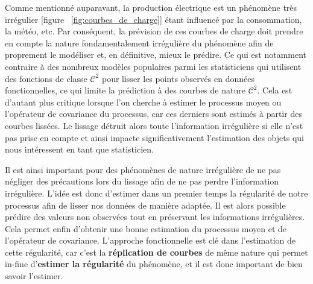 Comme mentionné auparavant, la production électrique est un phénomène très irrégulier [figure ~\ref{fig:courbes_de_charge}] étant influencé par la consommation, la météo, etc. Par conséquent, la prévision de ces courbes de charge doit prendre en compte la nature fondamentalement irrégulière du phénomène afin de proprement le modéliser et, en définitive, mieux le prédire. Ce qui est notamment contraire à des
nombreux modèles populaires parmi les statisticiens qui utilisent des fonctions de classe $\mathcal C^2$ pour lisser les points observés en données fonctionnelles, ce qui limite la prédiction à des courbes de nature $\mathcal C^2$. Cela est d'autant plus critique lorsque l'on cherche à estimer le processus moyen ou l'opérateur de covariance du processus, car ces derniers sont estimés à partir des courbes lissées. Le lissage détruit alors toute l'information irrégulière si elle n'est pas prise en compte et ainsi impacte significativement l'estimation des objets qui nous intéressent en tant que statisticien.




Il est ainsi important pour des phénomènes de nature irrégulière de ne pas négliger des précautions lors du lissage afin de ne pas perdre l'information irrégulière. L'idée est donc d'estimer dans un premier temps la régularité de notre processus afin de lisser nos données de manière adaptée. Il est alors possible prédire des valeurs non observées tout en préservant les informations irrégulières. Cela permet enfin d'obtenir une bonne estimation du processus moyen et de l'opérateur de covariance. L'approche fonctionnelle est clé dans l'estimation de cette régularité, car c'est la \textbf{réplication de courbes} de même nature qui permet in-fine d'\textbf{estimer la régularité} du phénomène, et il est donc important de bien savoir l'estimer.
